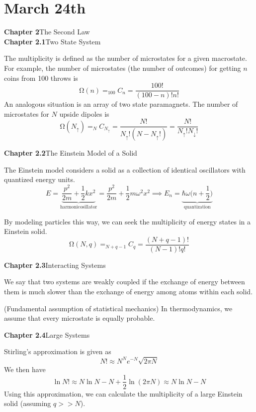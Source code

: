 \section{March 24th}
{\bf Chapter 2}\hspace{2ex}The Second Law
\\
{\bf Chapter 2.1}\hspace{2ex}Two State System
\\
\begin{defi}
The multiplicity is defined as the number of microstates for a given macrostate. For example, the number of microstates (the number of outcomes) for getting $n$ coins from 100 throws is
\[\mathrm{\Omega} (n)=_{100}C_{n}=\dfrac{100!}{(100-n)!n!}\]
An analogous situation is an array of two state paramagnets. The number of microstates for $N$ upside dipoles is
\[\mathrm{\Omega} (N_{\uparrow})=_{N}C_{N_{\uparrow}}=\dfrac{N!}{N_{\uparrow}!(N-N_{\uparrow}!)}=\dfrac{N!}{N_{\uparrow}!N_{\downarrow}!}\]
\end{defi}
\vspace{2ex}
{\bf Chapter 2.2}\hspace{2ex}The Einstein Model of a Solid
\\
\begin{defi}
The Einstein model considers a solid as a collection of identical oscillators with quantized energy units.\[E=\underbrace{\dfrac{p^2}{2m}+\dfrac{1}{2}kx^2}_{\mathrm{harmonic osillator}}=\dfrac{p^2}{2m}+\dfrac{1}{2}m\omega ^2x^2\implies E_{n}=\underbrace{\hbar \omega \Big(n+\dfrac{1}{2}\Big)}_{\mathrm{quantization}}\]
\end{defi}
\vspace{2ex}
\begin{ex}
By modeling particles this way, we can seek the multiplicity of energy states in a Einstein solid. 
\[\mathrm{\Omega} (N,q)=_{N+q-1}C_{q}=\dfrac{(N+q-1)!}{(N-1)!q!}\]
\end{ex}
\vspace{2ex}
{\bf Chapter 2.3}\hspace{2ex}Interacting Systems
\\
\begin{defi}
We say that two systems are weakly coupled if the exchange of energy between them is much slower than the exchange of energy among atoms within each solid.
\end{defi}
\vspace{2ex}
\begin{thm}
 (Fundamental assumption of statistical mechanics) In thermodynamics, we assume that every microstate is equally probable.
\end{thm}
\vspace{2ex}
{\bf Chapter 2.4}\hspace{5ex}Large Systems
\\
\begin{defi}
Stirling's approximation is given as
\[N!\approx N^{N}e^{-N}\sqrt{2\pi N}\]
We then have
\[\ln N!\approx N\ln N-N+\dfrac{1}{2}\ln(2\pi N)\approx N\ln N-N\]
Using this approximation, we can calculate the multiplicity of a large Einstein solid (assuming $q>>N$).
\end{defi}
\vspace{2ex}



